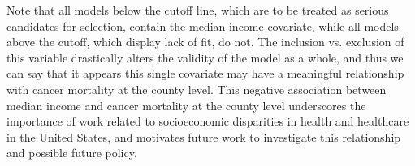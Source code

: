 		Note that all models below the cutoff line, which are to be treated as serious candidates for selection, contain the median income covariate, while all models
		above the cutoff, which display lack of fit, do not. The inclusion vs. exclusion of this variable drastically alters the validity of the model as a whole, and
		thus we can say that it appears this single covariate may have a meaningful relationship with cancer mortality at the county level. This negative association between
		median income and cancer mortality at the county level underscores the importance of work related to socioeconomic disparities in health and healthcare in the United States,
		and motivates future work to investigate this relationship and possible future policy.

